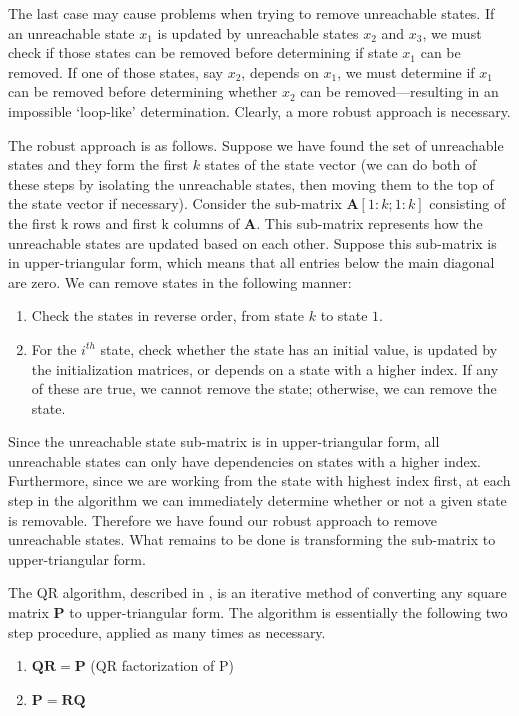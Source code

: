The last case may cause problems when trying to remove unreachable
states. If an unreachable state $x_1$ is updated by unreachable states
$x_2$ and $x_3$, we must check if those states can be removed before
determining if state $x_1$ can be removed.  If one of those states,
say $x_2$, depends on $x_1$, we must determine if $x_1$ can be removed
before determining whether $x_2$ can be removed---resulting in an
impossible `loop-like' determination. Clearly, a more robust approach
is necessary.

The robust approach is as follows.  Suppose we have found the set of
unreachable states and they form the first $k$ states of the state
vector (we can do both of these steps by isolating the unreachable
states, then moving them to the top of the state vector if
necessary). Consider the sub-matrix $\mathbf{A}[1:k;1:k]$ consisting
of the first k rows and first k columns of $\mathbf{A}$. This
sub-matrix represents how the unreachable states are updated based on
each other.  Suppose this sub-matrix is in upper-triangular form,
which means that all entries below the main diagonal are zero. We can
remove states in the following manner:
\begin{enumerate}
\vspace{\itemshrink} \item Check the states in reverse order, from state $k$ to state
$1$.

\vspace{\itemshrink} \item For the $i^{th}$ state, check whether the state has an
initial value, is updated by the initialization matrices, or
depends on a state with a higher index. If any of these are true,
we cannot remove the state; otherwise, we can remove the state.
\vspace{\itemshrink} \end{enumerate}

Since the unreachable state sub-matrix is in upper-triangular
form, all unreachable states can only have dependencies on states
with a higher index. Furthermore, since we are working from the
state with highest index first, at each step in the algorithm we
can immediately determine whether or not a given state is
removable. Therefore we have found our robust approach to remove
unreachable states. What remains to be done is transforming the
sub-matrix to upper-triangular form.

The QR algorithm, described in \cite{Trefethen}, is an iterative method of
converting any square matrix $\mathbf{P}$ to upper-triangular
form. The algorithm is essentially the following two step
procedure, applied as many times as necessary.
\begin{enumerate}
\vspace{\itemshrink} \item $\mathbf{Q} \mathbf{R} = \mathbf{P}$   (QR factorization of
P)

\vspace{\itemshrink} \item $\mathbf{P} = \mathbf{R} \mathbf{Q}$
\vspace{\itemshrink} \end{enumerate}

